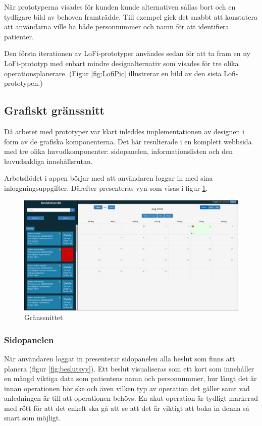 När prototyperna visades för kunden kunde alternativen sållas bort och en tydligare bild av behoven framträdde.
Till exempel gick det snabbt att konstatera att användarna ville ha både personnummer och namn för att identifiera patienter.

Den första iterationen av LoFi-prototyper användes sedan för att ta fram en ny
LoFi-prototyp med enbart mindre designalternativ som visades för tre olika
operationsplanerare. (Figur \ref{fig:LofiPic} illustrerar en bild av den sista Lofi-prototypen.)

\subsection{Grafiskt gränssnitt}
Då arbetet med prototyper var klart inleddes implementationen av designen i form av de grafiska komponenterna. Det här resulterade i en komplett webbsida med tre olika huvudkomponenter: sidopanelen, informationslisten och den huvudsakliga innehållsrutan.

Arbetsflödet i appen börjar med att användaren loggar in med sina inloggningsuppgifter. Därefter presenteras vyn som visas i figur \ref{fig:window}.

\begin{figure}
	\includegraphics[width=\linewidth]{Figures/window.png}
	\caption{Gränssnittet}
	\label{fig:window}
\end{figure}


\subsubsection{Sidopanelen}
När användaren loggat in presenterar sidopanelen alla beslut som finns att planera (figur \ref{fig:beslutsvy}). Ett beslut visualiseras som ett kort som innehåller en mängd viktiga data som patientens namn och personnummer, hur långt det är innan operationen bör ske och även vilken typ av operation det gäller samt vad anledningen är till att operationen behövs. En akut operation är tydligt markerad med rött för att det enkelt ska gå att se att det är viktigt att boka in denna så snart som möjligt.

